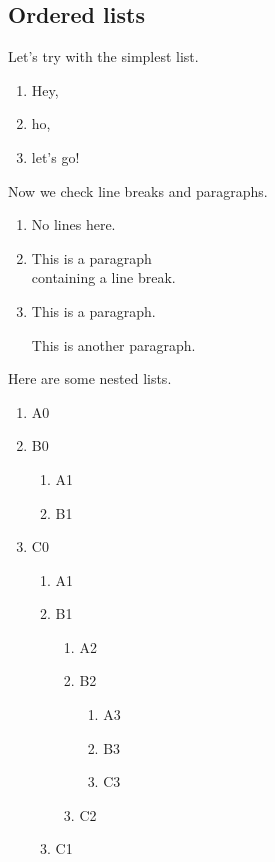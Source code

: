 \documentclass{Metanorma}
\begin{document}
  \subsection{Ordered lists}

  Let's try with the simplest list.

  \begin{enumerate}
    \item Hey,
    \item ho,
    \item let's go!
  \end{enumerate}

  Now we check line breaks and paragraphs.

  \begin{enumerate}
    \item No lines here.

    \item This is a paragraph\\
          containing a line break.

    \item This is a paragraph.

          This is another paragraph.
  \end{enumerate}

  Here are some nested lists.

  \begin{enumerate}
    \item A0
    \item B0
    \begin{enumerate}
      \item A1
      \item B1
    \end{enumerate}
    \item C0
    \begin{enumerate}
      \item A1
      \item B1
      \begin{enumerate}
        \item A2
        \item B2
        \begin{enumerate}
          \item A3
          \item B3
          \item C3
        \end{enumerate}
        \item C2
      \end{enumerate}
      \item C1
    \end{enumerate}
  \end{enumerate}
\end{document}
